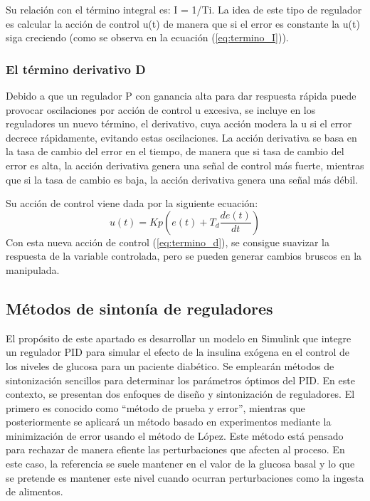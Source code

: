 Su relación con el término integral es: I = 1/Ti.
La idea de este tipo de regulador es calcular la acción de control u(t) de manera que si el error es constante la u(t) siga creciendo (como se observa en la ecuación (\ref{eq:termino_I})).

\subsubsection{El término derivativo D}

Debido a que un regulador P con ganancia alta para dar respuesta
rápida puede provocar oscilaciones por acción de control u excesiva, se incluye en los reguladores un nuevo término, el derivativo, cuya acción modera la u si el error decrece rápidamente, evitando estas oscilaciones. La acción derivativa se basa en la tasa de cambio del error en el tiempo, de manera que si tasa de cambio del error es alta, la acción derivativa genera una señal de control más fuerte, mientras que si la tasa de cambio es baja, la acción derivativa genera una señal más débil.

Su acción de control viene dada por la siguiente ecuación:
\begin{equation}
u(t) = Kp (e(t) + T_d \frac{d e(t)}{dt})
\label{eq:termino_d}
\end{equation}
Con esta nueva acción de control (\ref{eq:termino_d}), se consigue suavizar la respuesta de la variable controlada, pero se pueden generar cambios bruscos en la manipulada.

\subsection{Métodos de sintonía de reguladores}

El propósito de este apartado es desarrollar un modelo en Simulink que integre un regulador PID para simular el efecto de la insulina exógena en el control de los niveles de glucosa para un paciente diabético. Se emplearán métodos de sintonización sencillos para determinar los parámetros óptimos del PID.
En este contexto, se presentan dos enfoques de diseño y sintonización de reguladores. El primero es conocido como “método de prueba y error”, mientras que posteriormente se aplicará un método basado en experimentos mediante la minimización de error usando el método de López. Este método está pensado para rechazar de manera efiente las perturbaciones que afecten al proceso. En este caso, la referencia se suele mantener en el valor de la glucosa basal y lo que se pretende es mantener este nivel cuando ocurran perturbaciones como la ingesta de alimentos.

